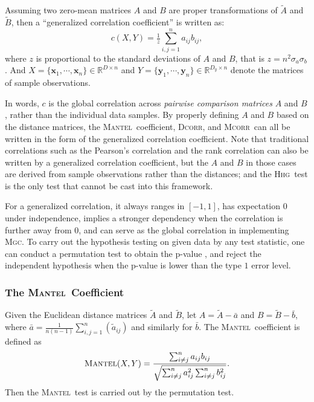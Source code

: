 \documentclass[11pt]{article}
\providecommand{\sct}[1]{{\normalfont\textsc{#1}}}
\providecommand{\mb}[1]{\boldsymbol{#1}}
\newcommand{\Real}{\mathbb{R}}
\newcommand{\G}{c}
\newcommand{\Mgc}{\sct{Mgc}}
\newcommand{\Hhg}{\sct{Hhg}}
\newcommand{\Dcorr}{\sct{Dcorr}}
\newcommand{\Mcorr}{\sct{Mcorr}}
\newcommand{\Mantel}{\sct{Mantel}}
\begin{document}
Assuming two zero-mean matrices $A$ and $B$ are proper transformations of $\tilde{A}$ and $\tilde{B}$, then a ``generalized correlation coefficient''  \cite{Spearman1904,KendallBook} is written as:
\begin{equation}
\label{generalCoef}
\G(X,Y)= \tfrac{1}{z} {\textstyle \sum_{i,j=1}^n a_{ij} b_{ij}},
\end{equation}
where $z$ is proportional to the standard deviations of $A$ and $B$, that is $z=n^2\sigma_a \sigma_b$. And $X=\{\mb{x}_{1},\cdots, \mb{x}_{n}\} \in \Real^{D \times n}$ and $Y=\{\mb{y}_{1},\cdots, \mb{y}_{n}\} \in \Real^{D_y \times n}$ denote the matrices of sample observations.

In words, $\G$ is the global correlation across \emph{pairwise comparison matrices} $A$ and $B$, rather than the individual data samples. By properly defining $A$ and $B$ based on the distance matrices, the \Mantel~coefficient, \Dcorr, and \Mcorr~can all be written in the form of the generalized correlation coefficient. Note that traditional correlations such as the Pearson's correlation and the rank correlation can also be written by a generalized correlation coefficient, but the $A$ and $B$ in those cases are derived from sample observations rather than the distances; and the \Hhg~test is the only test that cannot be cast into this framework.

For a generalized correlation, it always ranges in $[-1,1]$, has expectation $0$ under independence, implies a stronger dependency when the correlation is further away from $0$, and can serve as the global correlation in implementing \Mgc. To carry out the hypothesis testing on given data by any test statistic, one can conduct a permutation test to obtain the p-value \cite{GoodPermutationBook}, and reject the independent hypothesis when the p-value is lower than the type $1$ error level. 

\subsubsection{The \Mantel~Coefficient}
\label{appen:mantel}
Given the Euclidean distance matrices $\tilde{A}$ and $\tilde{B}$, let $A=\tilde{A}-\bar{a}$ and $B=\tilde{B}-\bar{b}$, where $\bar{a}=\frac{1}{n(n-1)}\sum_{i,j=1}^{n}(\tilde{a}_{ij})$ and similarly for $\bar{b}$.
The \Mantel~coefficient \cite{Mantel1967} is defined as
\begin{equation*}
\Mantel(X,Y)=\frac{\sum_{i \neq j}^{n}a_{ij}b_{ij}}{\sqrt{\sum_{i \neq j}^{n}a_{ij}^2 \sum_{i \neq j}^{n}b_{ij}^2}}.
\end{equation*}
Then the \Mantel~test is carried out by the permutation test.
\end{document}

